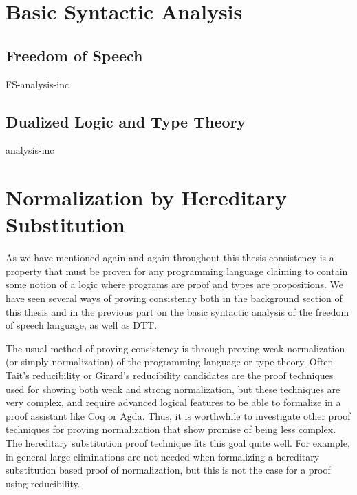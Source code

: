 \documentclass[phd,appendix,dedicationpage,ackpage,epigraphpage]{uithesis}
\begin{document}
\part{Basic Syntactic Analysis}
\label{part:basic-analysis}

\chapter{Freedom of Speech}
\label{chap:freedom_of_speech_anal}
{FS-analysis-inc}

\chapter{Dualized Logic and Type Theory}
\label{chap:dualized_type_theory_anal}
{analysis-inc}


\part{Normalization by Hereditary Substitution}
\label{part:norm-hs}

As we have mentioned again and again throughout this thesis
consistency is a property that must be proven for any programming
language claiming to contain some notion of a logic where programs are
proof and types are propositions.  We have seen several ways of
proving consistency both in the background section of this thesis and
in the previous part on the basic syntactic analysis of the freedom of
speech language, as well as DTT.

The usual method of proving consistency is through proving weak
normalization (or simply normalization) of the programming language or
type theory.  Often Tait's reducibility or Girard's reducibility
candidates are the proof techniques used for showing both weak and
strong normalization, but these techniques are very complex, and
require advanced logical features to be able to formalize in a proof
assistant like Coq or Agda.  Thus, it is worthwhile to investigate
other proof techniques for proving normalization that show promise of
being less complex.  The hereditary substitution proof technique fits
this goal quite well.  For example, in general large eliminations are
not needed when formalizing a hereditary substitution based proof of
normalization, but this is not the case for a proof using
reducibility.
\end{document}
